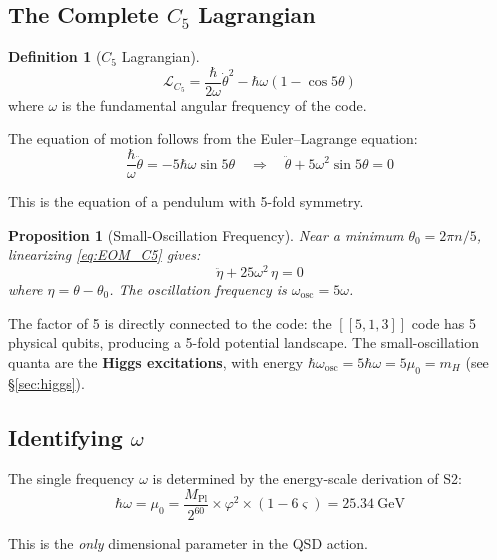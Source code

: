 \documentclass[11pt,a4paper]{article}
\newtheorem{proposition}[theorem]{Proposition}
\theoremstyle{definition}
\newtheorem{definition}[theorem]{Definition}
\theoremstyle{remark}
\newcommand{\strain}{\varsigma}
\newcommand{\gr}{\varphi}
\newcommand{\murad}{\mu_0}
\newcommand{\Mpl}{M_{\mathrm{Pl}}}
\newcommand{\mH}{m_H}
\newcommand{\LL}{\mathcal{L}}
\begin{document}
\subsection{The Complete $C_5$ Lagrangian}

\begin{definition}[$C_5$ Lagrangian]
\label{def:LC5}
\begin{equation}
\boxed{\LL_{C_5} = \frac{\hbar}{2\omega}\dot{\theta}^2 - \hbar\omega(1 - \cos 5\theta)}
\end{equation}
where $\omega$ is the fundamental angular frequency of the code.
\end{definition}

The equation of motion follows from the Euler--Lagrange equation:
\begin{equation}
\frac{\hbar}{\omega}\ddot{\theta} = -5\hbar\omega\sin 5\theta \quad \Longrightarrow \quad \ddot{\theta} + 5\omega^2\sin 5\theta = 0
\label{eq:EOM_C5}
\end{equation}

This is the equation of a pendulum with 5-fold symmetry.

\begin{proposition}[Small-Oscillation Frequency]
\label{prop:osc}
Near a minimum $\theta_0 = 2\pi n/5$, linearizing \eqref{eq:EOM_C5} gives:
\begin{equation}
\ddot{\eta} + 25\omega^2\,\eta = 0
\end{equation}
where $\eta = \theta - \theta_0$. The oscillation frequency is $\omega_{\mathrm{osc}} = 5\omega$.
\end{proposition}

The factor of 5 is directly connected to the code: the $[[5,1,3]]$ code has 5 physical qubits, producing a 5-fold potential landscape. The small-oscillation quanta are the \textbf{Higgs excitations}, with energy $\hbar\omega_{\mathrm{osc}} = 5\hbar\omega = 5\murad = \mH$ (see \S\ref{sec:higgs}).

\subsection{Identifying $\omega$}

The single frequency $\omega$ is determined by the energy-scale derivation of S2:
\begin{equation}
\hbar\omega = \murad = \frac{\Mpl}{2^{60}} \times \gr^2 \times (1 - 6\strain) = 25.34~\text{GeV}
\end{equation}

This is the \emph{only} dimensional parameter in the QSD action.
\end{document}
